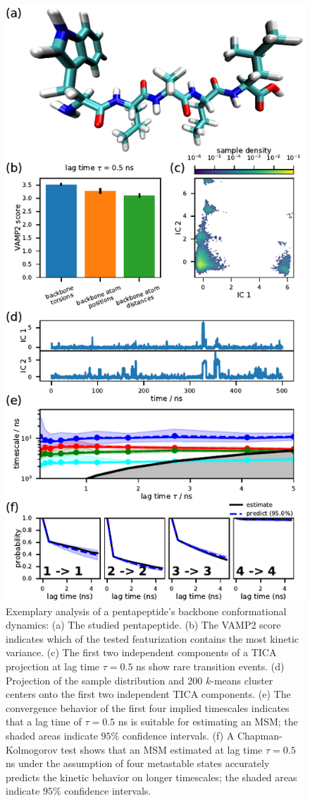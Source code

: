 \documentclass[9pt,tutorial]{livecoms}
\begin{document}
\begin{figure}
\includegraphics{figure_1}
\caption{Exemplary analysis of a pentapeptide's backbone conformational dynamics: (a) The studied pentapeptide. (b) The VAMP2 score indicates which of the tested featurization contains the most kinetic variance. (c) The first two independent components of a TICA projection at lag time $\tau=0.5$ ns show rare transition events. (d) Projection of the sample distribution and 200 $k$-means cluster centers onto the first two independent TICA components. (e) The convergence behavior of the first four implied timescales indicates that a lag time of $\tau=0.5$ ns is suitable for estimating an MSM; the shaded areas indicate $95\%$ confidence intervals. (f) A Chapman-Kolmogorov test shows that an MSM estimated at lag time $\tau=0.5$ ns under the assumption of four metastable states accurately predicts the kinetic behavior on longer timescales; the shaded areas indicate $95\%$ confidence intervals.}

\end{figure}
\end{document}
